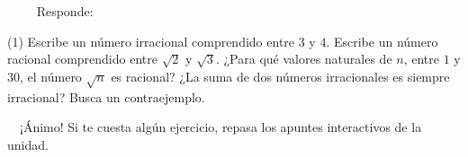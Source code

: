 \documentclass[11pt,a4paper]{article}
\newcommand{\estrelles}[1]{{\color{accent}\ifcase#1\or\faStar\faStar[regular]\faStar[regular]\or\faStar\faStar\faStar[regular]\or\faStar\faStar\faStar\fi}}
\newcounter{exer}
\newcommand{\ex}[1]{\par\needspace{4\baselineskip}\medskip\stepcounter{exer}\noindent{\color{navy}\bfseries\theexer.}\ \ {\small\estrelles{#1}}\ \ }
\begin{document}
\ex{3} Responde:
\begin{tasks}(1)
  \task Escribe un número irracional comprendido entre $3$ y $4$.
  \task Escribe un número racional comprendido entre $\sqrt{2}$ y $\sqrt{3}$.
  \task ¿Para qué valores naturales de $n$, entre $1$ y $30$, el número $\sqrt{n}$ es racional?
  \task ¿La suma de dos números irracionales es siempre irracional? Busca un contraejemplo.
\end{tasks}

\vfill
\begin{center}\color{muted}\small\faCheckCircle[regular]\ \ ¡Ánimo! Si te cuesta algún ejercicio, repasa los apuntes interactivos de la unidad.\end{center}
\end{document}
